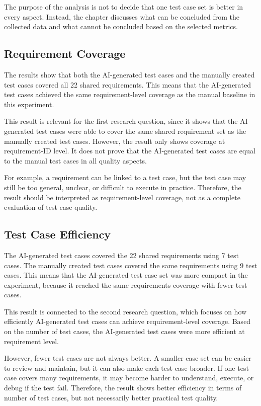 \documentclass[a4paper,12pt]{article}
\begin{document}
The purpose of the analysis is not to decide that one test case set is better in every aspect. Instead, the chapter discusses what can be concluded from the collected data and what cannot be concluded based on the selected metrics.

\subsection{Requirement Coverage}
The results show that both the AI-generated test cases and the manually created test cases covered all 22 shared requirements. This means that the AI-generated test cases achieved the same requirement-level coverage as the manual baseline in this experiment.

This result is relevant for the first research question, since it shows that the AI-generated test cases were able to cover the same shared requirement set as the manually created test cases. However, the result only shows coverage at requirement-ID level. It does not prove that the AI-generated test cases are equal to the manual test cases in all quality aspects.

For example, a requirement can be linked to a test case, but the test case may still be too general, unclear, or difficult to execute in practice. Therefore, the result should be interpreted as requirement-level coverage, not as a complete evaluation of test case quality.

\subsection{Test Case Efficiency}
The AI-generated test cases covered the 22 shared requirements using 7 test cases. The manually created test cases covered the same requirements using 9 test cases. This means that the AI-generated test case set was more compact in the experiment, because it reached the same requirements coverage with fewer test cases.

This result is connected to the second research question, which focuses on how efficiently AI-generated test cases can achieve requirement-level coverage. Based on the number of test cases, the AI-generated test cases were more efficient at requirement level.

However, fewer test cases are not always better. A smaller case set can be easier to review and maintain, but it can also make each test case broader. If one test case covers many requirements, it may become harder to understand, execute, or debug if the test fail. Therefore, the result shows better efficiency in terms of number of test cases, but not necessarily better practical test quality.
\end{document}
